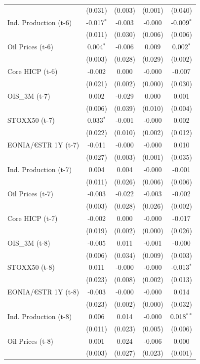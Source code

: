 \begin{longtable}[t]{lcccc}
 & (0.031) & (0.003) & (0.001) & (0.040)\\
Ind. Production (t-6) & -0.017$^{*}$ & -0.003 & -0.000 & -0.009$^{*}$\\
 & (0.011) & (0.030) & (0.006) & (0.006)\\
Oil Prices (t-6) & 0.004$^{*}$ & -0.006 & 0.009 & 0.002$^{*}$\\
 & (0.003) & (0.028) & (0.029) & (0.002)\\
Core HICP (t-6) & -0.002 & 0.000 & -0.000 & -0.007\\
 & (0.021) & (0.002) & (0.000) & (0.030)\\
OIS\_3M (t-7) & 0.002 & -0.029 & 0.000 & 0.001\\
 & (0.006) & (0.039) & (0.010) & (0.004)\\
STOXX50 (t-7) & 0.033$^{*}$ & -0.001 & -0.000 & 0.002\\
 & (0.022) & (0.010) & (0.002) & (0.012)\\
EONIA/€STR 1Y (t-7) & -0.011 & -0.000 & -0.000 & 0.010\\
 & (0.027) & (0.003) & (0.001) & (0.035)\\
Ind. Production (t-7) & 0.004 & 0.004 & -0.000 & -0.001\\
 & (0.011) & (0.026) & (0.006) & (0.006)\\
Oil Prices (t-7) & -0.003 & -0.022 & -0.003 & -0.002\\
 & (0.003) & (0.028) & (0.026) & (0.002)\\
Core HICP (t-7) & -0.002 & 0.000 & -0.000 & -0.017\\
 & (0.019) & (0.002) & (0.000) & (0.026)\\
OIS\_3M (t-8) & -0.005 & 0.011 & -0.001 & -0.000\\
 & (0.006) & (0.034) & (0.009) & (0.003)\\
STOXX50 (t-8) & 0.011 & -0.000 & -0.000 & -0.013$^{*}$\\
 & (0.023) & (0.008) & (0.002) & (0.013)\\
EONIA/€STR 1Y (t-8) & -0.003 & -0.000 & -0.000 & 0.014\\
 & (0.023) & (0.002) & (0.000) & (0.032)\\
Ind. Production (t-8) & 0.006 & 0.014 & -0.000 & 0.018$^{**}$\\
 & (0.011) & (0.023) & (0.005) & (0.006)\\
Oil Prices (t-8) & 0.001 & 0.024 & -0.006 & 0.000\\
 & (0.003) & (0.027) & (0.023) & (0.001)\\

\end{longtable}
